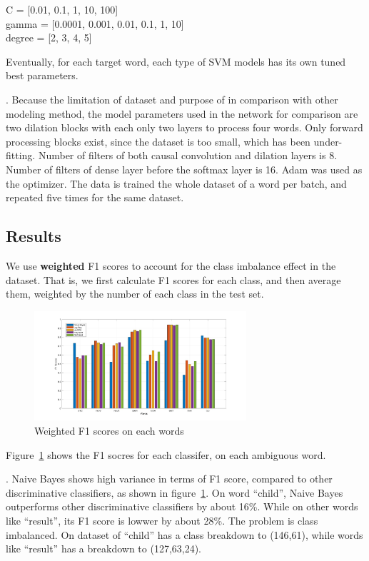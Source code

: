 C = [0.01, 0.1, 1, 10, 100] \\
gamma = [0.0001, 0.001, 0.01, 0.1, 1, 10] \\
degree = [2, 3, 4, 5]

Eventually, for each target word, each type of SVM models has its own tuned best
parameters.

.
Because the limitation of dataset and purpose of in comparison with other modeling method, the model parameters used in the network for comparison are two dilation blocks with each only two layers to process four words. Only forward processing blocks exist, since the dataset is too small, which has been under-fitting. Number of filters of both causal convolution and dilation layers is 8. Number of filters of dense layer before the softmax layer is 16. Adam was used as the optimizer. The data is trained the whole dataset of a word per batch, and repeated five times for the same dataset. 

\subsection{Results}
\label{sec:eval:results}

We use \textbf{weighted} F1 scores to account for the class imbalance effect in
the dataset. 
That is, we first calculate F1 scores for each class, and then average them,
weighted by the number of each class in the test set.

\begin{figure}[h]
  \centering 
  \includegraphics[width=0.7\textwidth]{plots/f1.jpg}
    \caption{Weighted F1 scores on each words}
    \label{fig:results:f1}
\end{figure}

Figure~\ref{fig:results:f1} shows the F1 socres for each classifer,
on each ambiguous word.

.
Naive Bayes shows high variance in terms of F1 score, compared to other
discriminative classifiers, as shown in figure~\ref{fig:results:f1}.
On word ``child'', Naive Bayes outperforms other discriminative classifiers by
about 16\%.
While on other words like ``result'', its F1 score is lowwer by about 28\%.
The problem is class imbalanced. 
On dataset of ``child'' has a class breakdown to (146,61), while words like
``result'' has a breakdown to (127,63,24).
